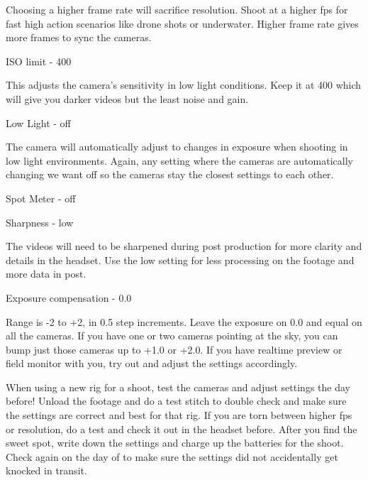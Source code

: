 \begin{fullwidth}
Choosing a higher frame rate will sacrifice resolution. Shoot at a higher fps for fast high action scenarios like drone shots or underwater. Higher frame rate gives more frames to sync the cameras.

{\large ISO limit - 400 \par}


This adjusts the camera’s sensitivity in low light conditions. Keep it at 400 which will give you darker videos but the least noise and gain. 

\clearpage
{\large Low Light - off \par}


The camera will automatically adjust to changes in exposure when shooting in low light environments. Again, any setting where the cameras are automatically changing we want off so the cameras stay the closest settings to each other. 

{\large Spot Meter - off \par}


\clearpage
{\large Sharpness - low \par}


The videos will need to be sharpened during post production for more clarity and details in the headset. Use the low setting for less processing on the footage and more data in post. 

{\large Exposure compensation - 0.0 \par} 


Range is -2 to +2, in 0.5 step increments. Leave the exposure on 0.0 and equal on all the cameras. If you have one or two cameras pointing at the sky, you can bump just those cameras up to +1.0 or +2.0. If you have realtime preview or field monitor with you, try out and adjust the settings accordingly. 

When using a new rig for a shoot, test the cameras and adjust settings the day before! Unload the footage and do a test stitch to double check and make sure the settings are correct and best for that rig. If you are torn between higher fps or resolution, do a test and check it out in the headset before. After you find the sweet spot, write down the settings and charge up the batteries for the shoot. Check again on the day of to make sure the settings did not accidentally get knocked in transit. 

\clearpage
\end{fullwidth}